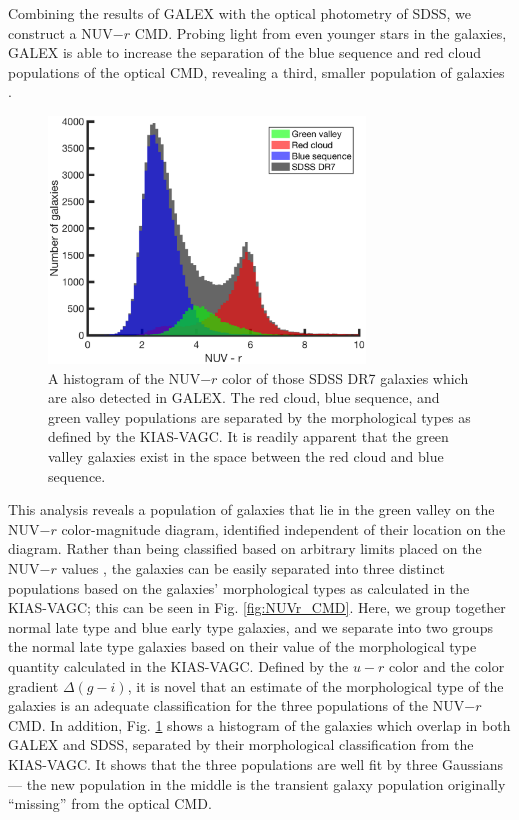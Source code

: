 Combining the results of GALEX with the optical photometry of SDSS, we construct 
a NUV$-r$ CMD.  Probing light from even younger stars in the galaxies, GALEX is 
able to increase the separation of the blue sequence and red cloud populations 
of the optical CMD, revealing a third, smaller population of galaxies 
\citep{Wyder07}.

\begin{figure}
    \includegraphics[width=0.75\textwidth]{Images/GV/NUVr_CMDclassifications}
    \caption[Distribution of NUV-$r$ for SDSS galaxies]{A histogram of the 
    NUV$-r$ color of those SDSS DR7 galaxies which are also detected in GALEX.  
    The red cloud, blue sequence, and green valley populations are separated by 
    the morphological types as defined by the KIAS-VAGC.  It is readily apparent 
    that the green valley galaxies exist in the space between the red cloud and 
    blue sequence.}
    \label{fig:NUVr_hist}
\end{figure}

This analysis reveals a population of galaxies that lie in the green valley on 
the NUV$-r$ color-magnitude diagram, identified independent of their location on 
the diagram.  Rather than being classified based on arbitrary limits placed on 
the NUV$-r$ values \citep[as done by][]{Schawinski14,Salim14a}, the galaxies can 
be easily separated into three distinct populations based on the galaxies' 
morphological types as calculated in the KIAS-VAGC; this can be seen in Fig. 
\ref{fig:NUVr_CMD}.  Here, we group together normal late type and blue early 
type galaxies, and we separate into two groups the normal late type galaxies 
based on their value of the morphological type quantity calculated in the 
KIAS-VAGC.  Defined by the $u-r$ color and the color gradient $\Delta (g-i)$, it 
is novel that an estimate of the morphological type of the galaxies is an 
adequate classification for the three populations of the NUV$-r$ CMD.  In 
addition, Fig. \ref{fig:NUVr_hist} shows a histogram of the galaxies which 
overlap in both GALEX and SDSS, separated by their morphological classification 
from the KIAS-VAGC.  It shows that the three populations are well fit by three 
Gaussians --- the new population in the middle is the transient galaxy 
population originally ``missing'' from the optical CMD.

